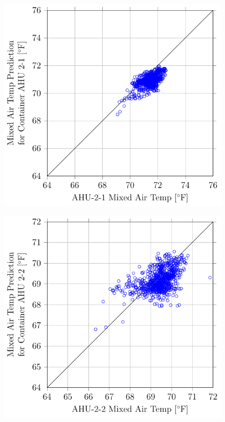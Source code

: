 \begin{figure}
\centering
\includegraphics[]{Plots/2016-09-07-1357-MixedAirTempPredictionforContainerAHU21vsAHU21MixedAirTemp.pdf}
\caption{}
\label{fig:2016-09-07-1357-MixedAirTempPredictionforContainerAHU21vsAHU21MixedAirTemp}
\end{figure}

\begin{figure}
\centering
\includegraphics[]{Plots/2016-09-07-1619-MixedAirTempPredictionforContainerAHU22vsAHU22MixedAirTemp.pdf}
\caption{}
\label{fig:2016-09-07-1619-MixedAirTempPredictionforContainerAHU22vsAHU22MixedAirTemp}
\end{figure}

